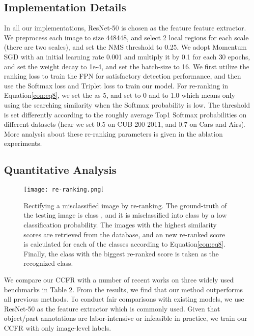 \documentclass[10pt,twocolumn,letterpaper]{article}
\begin{document}
\subsection{Implementation Details}
In all our implementations, ResNet-50 is chosen as the feature feature extractor. We preprocess each image to size 448448, and select 2 local regions for each scale (there are two scales), and set the NMS threshold to 0.25. We adopt Momentum SGD with an initial learning rate 0.001 and multiply it by 0.1 for each 30 epochs, and set the weight decay to 1e-4, and set the batch-size to 16. We first utilize the ranking loss\cite{YangLWHGW18} to train the FPN for satisfactory detection performance, and then use the Softmax loss and Triplet loss to train our model. For re-ranking in Equation\ref{con:eq8}, we set the  as 5, and set  to 0 and  to 1.0 which means only using the searching similarity when the Softmax probability is low. The threshold  is set differently according to the roughly average Top1 Softmax probabilities on different datasets (hear we set 0.5 on CUB-200-2011, and 0.7 on Cars and Airs). More analysis about these re-ranking parameters is given in the ablation experiments.


\subsection{Quantitative Analysis}
\begin{figure}[t]
\begin{center}
\texttt{[image: re-ranking.png]}
\end{center}
   \caption{Rectifying a misclassified image by re-ranking. The ground-truth of the testing image is class , and it is misclassified into class  by a low classification probability. The  images with the highest similarity scores are retrieved from the database, and an new re-ranked score is calculated for each of the  classes according to Equation\ref{con:eq8}. Finally, the class  with the biggest re-ranked score is taken as the recognized class.}
\label{re_ranking}
\end{figure}



We compare our CCFR with a number of recent works on three widely used benchmarks in Table 2. From the results, we find that our method outperforms all previous methods. To conduct fair comparisons with existing models, we use ResNet-50 as the feature extractor which is commonly used. Given that object/part annotations are labor-intensive or infeasible in practice, we train our CCFR with only image-level labels. 
\end{document}
